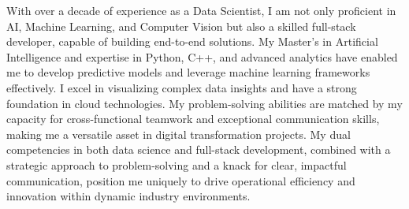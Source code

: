 %
%
%
\par{
With over a decade of experience as a Data Scientist, I am not only proficient in AI, Machine Learning, and Computer Vision but also a skilled full-stack developer, capable of building end-to-end solutions. My Master's in Artificial Intelligence and expertise in Python, C++, and advanced analytics have enabled me to develop predictive models and leverage machine learning frameworks effectively. I excel in visualizing complex data insights and have a strong foundation in cloud technologies. My problem-solving abilities are matched by my capacity for cross-functional teamwork and exceptional communication skills, making me a versatile asset in digital transformation projects. My dual competencies in both data science and full-stack development, combined with a strategic approach to problem-solving and a knack for clear, impactful communication, position me uniquely to drive operational efficiency and innovation within dynamic industry environments.
}
\vspace{6.6mm}
